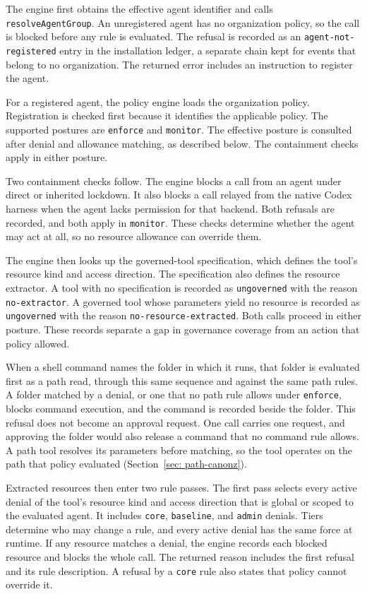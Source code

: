 {\color{red}\setlength{\emergencystretch}{2em}The engine first obtains the effective agent identifier and calls
\texttt{resolveAgentGroup}. An unregistered agent has no organization policy,
so the call is blocked before any rule is evaluated. The refusal is recorded
as an \texttt{agent-not-registered} entry in the installation ledger, a
separate chain kept for events that belong to no organization. The returned
error includes an instruction to register the agent.

For a registered agent, the policy engine loads the organization policy.
Registration is checked first because it identifies the applicable policy.
The supported postures are \texttt{enforce} and \texttt{monitor}. The
effective posture is consulted after denial and allowance matching, as
described below. The containment checks apply in either posture.

Two containment checks follow. The engine blocks a call from an agent under
direct or inherited lockdown. It also blocks a call relayed from the native
Codex harness when the agent lacks permission for that backend. Both refusals
are recorded, and both apply in \texttt{monitor}. These checks determine
whether the agent may act at all, so no resource allowance can override them.

The engine then looks up the governed-tool specification, which defines the
tool's resource kind and access direction. The specification also defines
the resource extractor. A tool with no
specification is recorded as \texttt{ungoverned} with the reason
\texttt{no-extractor}. A governed tool whose parameters yield no resource is
recorded as \texttt{ungoverned} with the reason
\texttt{no-resource-extracted}. Both calls proceed in either posture. These
records separate a gap in governance coverage from an action that policy
allowed.

When a shell command names the folder in which it runs, that folder is
evaluated first as a path read, through this same sequence and against the
same path rules. A folder matched by a denial, or one that no path rule allows
under \texttt{enforce}, blocks command execution, and the command is
recorded beside the folder. This refusal does not become an approval request.
One call carries one request, and approving the folder would also release a
command that no command rule allows. A path tool resolves its parameters
before matching, so the tool operates on the path that policy evaluated
(Section~\ref{sec: path-canonz}).

Extracted resources then enter two rule passes. The first pass selects every
active denial of the tool's resource kind and access direction that is global
or scoped to the evaluated agent. It includes \texttt{core}, \texttt{baseline},
and \texttt{admin} denials. Tiers determine who may change a rule, and every
active denial has the same force at runtime. If any resource matches a denial,
the engine records each blocked resource and blocks the whole call. The
returned reason includes the first refusal and its rule description. A refusal by
a \texttt{core} rule also states that policy cannot override it.

}

